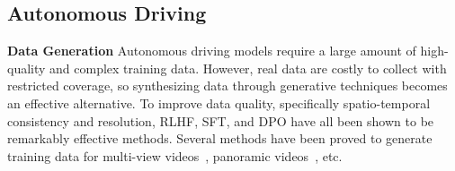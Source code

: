 \subsection{Autonomous Driving}
\noindent\textbf{Data Generation} Autonomous driving models require a large amount of high-quality and complex training data. However, real data are costly to collect with restricted coverage, so synthesizing data through generative techniques becomes an effective alternative. To improve data quality, specifically spatio-temporal consistency and resolution, RLHF, SFT, and DPO have all been shown to be remarkably effective methods. Several methods have been proved to generate training data for multi-view videos~\citep{li2023drivingdiffusion}, panoramic videos~\citep{wen2024panacea}, etc. 


